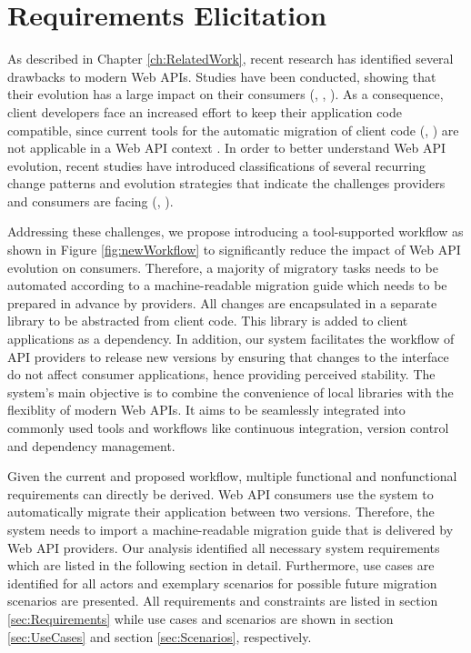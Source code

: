 \chapter{Requirements Elicitation}
\label{ch:RequirementsElicitation}

As described in Chapter \ref{ch:RelatedWork}, recent research has identified several drawbacks to modern Web APIs. Studies have been conducted, showing that their evolution has a large impact on their consumers (\cite{brito_you_2020}, \cite{xavier_historical_2017}, \cite{espinha_web_2014}). As a consequence, client developers face an increased effort to keep their application code compatible, since current tools for the automatic migration of client code (\cite{henkel_catchup!_2005}, \cite{hutchison_automated_2006}) are not applicable in a Web API context \cite{li_how_2013}. In order to better understand Web API evolution, recent studies have introduced classifications of several recurring change patterns and evolution strategies that indicate the challenges providers and consumers are facing (\cite{li_how_2013}, \cite{lubke_interface_2019}). 

Addressing these challenges, we propose introducing a tool-supported workflow as shown in Figure \ref{fig:newWorkflow} to significantly reduce the impact of Web API evolution on consumers. Therefore, a majority of migratory tasks needs to be automated according to a machine-readable migration guide which needs to be prepared in advance by providers. All changes are encapsulated in a separate library to be abstracted from client code. This library is added to client applications as a dependency. In addition, our system facilitates the workflow of API providers to release new versions by ensuring that changes to the interface do not affect consumer applications, hence providing perceived stability. The system's main objective is to combine the convenience of local libraries with the flexiblity of modern Web APIs. It aims to be seamlessly integrated into commonly used tools and workflows like continuous integration, version control and dependency management. 

Given the current and proposed workflow, multiple functional and nonfunctional requirements can directly be derived. Web API consumers use the system to automatically migrate their application between two versions. Therefore, the system needs to import a machine-readable migration guide that is delivered by Web API providers. Our analysis identified all necessary system requirements which are listed in the following section in detail. Furthermore, use cases are identified for all actors and exemplary scenarios for possible future migration scenarios are presented. All requirements and constraints are listed in section \ref{sec:Requirements} while use cases and scenarios are shown in section \ref{sec:UseCases} and section \ref{sec:Scenarios}, respectively.
\newpage


\newpage
